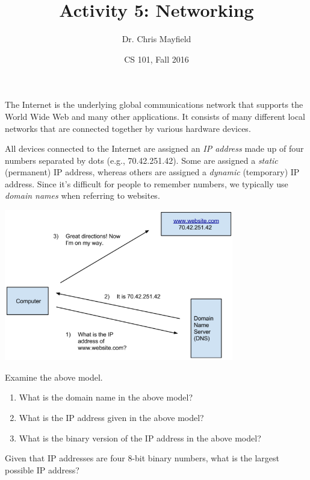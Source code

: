 \documentclass[12pt]{article}
\title{Activity 5: Networking}
\author{Dr. Chris Mayfield}
\date{CS 101, Fall 2016}
\begin{document}
\maketitle

The Internet is the underlying global communications network that supports the World Wide Web and many other applications. It consists of many different local networks that are connected together by various hardware devices.



All devices connected to the Internet are assigned an \emph{IP address} made up of four numbers separated by dots (e.g., 70.42.251.42). Some are assigned a \emph{static} (permanent) IP address, whereas others are assigned a \emph{dynamic} (temporary) IP address. Since it's difficult for people to remember numbers, we typically use \emph{domain names} when referring to websites.

\begin{center}
\includegraphics[width=0.75\textwidth]{dns.png}
\end{center}




\Q Examine the above model.
\begin{enumerate}
\item What is the domain name in the above model?
\item What is the IP address given in the above model?
\item What is the binary version of the IP address in the above model?
\end{enumerate}


\Q Given that IP addresses are four 8-bit binary numbers, what is the largest possible IP address?

\begin{answer}
\end{answer}
\end{document}
